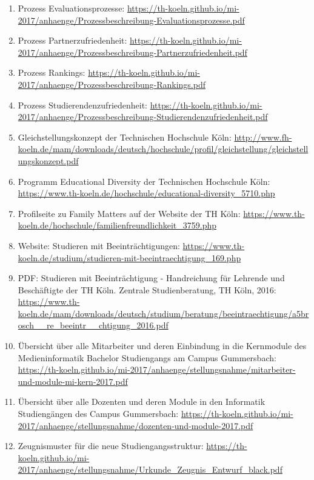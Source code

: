 \documentclass[BCOR12mm,DIV11,titlepage,a4paper,oneside,10pt]{scrbook}
\begin{document}
\begin{sloppypar}
\begin{flushleft}
\begin{enumerate}
\item{Prozess Evaluationsprozesse: \url{https://th-koeln.github.io/mi-2017/anhaenge/Prozessbeschreibung-Evaluationsprozesse.pdf} } 
\item{Prozess Partnerzufriedenheit: \url{https://th-koeln.github.io/mi-2017/anhaenge/Prozessbeschreibung-Partnerzufriedenheit.pdf} } 
\item{Prozess Rankings: \url{https://th-koeln.github.io/mi-2017/anhaenge/Prozessbeschreibung-Rankings.pdf} } 
\item{Prozess Studierendenzufriedenheit: \url{https://th-koeln.github.io/mi-2017/anhaenge/Prozessbeschreibung-Studierendenzufriedenheit.pdf} } 
\item{Gleichstellungskonzept der Technischen Hochschule Köln: \url{http://www.fh-koeln.de/mam/downloads/deutsch/hochschule/profil/gleichstellung/gleichstellungskonzept.pdf} } 
\item{Programm Educational Diversity der Technischen Hochschule Köln: \url{https://www.th-koeln.de/hochschule/educational-diversity\_5710.php} } 
\item{Profilseite zu Family Matters auf der Website der TH Köln: \url{https://www.th-koeln.de/hochschule/familienfreundlichkeit\_3759.php} } 
\item{Website: Studieren mit Beeinträchtigungen: \url{https://www.th-koeln.de/studium/studieren-mit-beeintraechtigung\_169.php} } 
\item{PDF: Studieren mit Beeinträchtigung - Handreichung für Lehrende und Beschäftigte der TH Köln. Zentrale Studienberatung, TH Köln, 2016: \url{https://www.th-koeln.de/mam/downloads/deutsch/studium/beratung/beeintraechtigung/a5brosch\_\_re\_beeintr\_\_chtigung\_2016.pdf} } 
\item{Übersicht über alle Mitarbeiter und deren Einbindung in die Kernmodule des Medieninformatik Bachelor Studiengangs am Campus Gummersbach: \url{https://th-koeln.github.io/mi-2017/anhaenge/stellungsnahme/mitarbeiter-und-module-mi-kern-2017.pdf} } 
\item{Übersicht über alle Dozenten und deren Module in den Informatik Studiengängen des Campus Gummersbach: \url{https://th-koeln.github.io/mi-2017/anhaenge/stellungsnahme/dozenten-und-module-2017.pdf} } 
\item{Zeugnismuster für die neue Studiengangsstruktur: \url{https://th-koeln.github.io/mi-2017/anhaenge/stellungsnahme/Urkunde\_Zeugnis\_Entwurf\_black.pdf} } 

\end{enumerate}

\end{flushleft}
\end{sloppypar}

\backmatter
\end{document}
